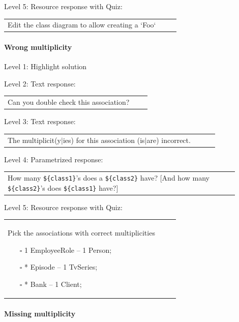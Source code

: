 \noindent Level 5: Resource response with Quiz: \medskip

\begin{tabular}{|p{0.9\linewidth}}
Edit the class diagram to allow creating a `Foo`
\end{tabular} \medskip


\paragraph{Wrong multiplicity}

\noindent Level 1: Highlight solution \medskip

\noindent Level 2: Text response: \medskip

\begin{tabular}{|p{0.9\linewidth}}
Can you double check this association?
\end{tabular} \medskip

\noindent Level 3: Text response: \medskip

\begin{tabular}{|p{0.9\linewidth}}
The multiplicit(y$|$ies) for this association (is$|$are) incorrect.
\end{tabular} \medskip

\noindent Level 4: Parametrized response: \medskip

\begin{tabular}{|p{0.9\linewidth}}
How many \verb|${class1}|'s does a \verb|${class2}| have? [And how many \verb|${class2}|'s does \verb|${class1}| have?]
\end{tabular} \medskip

\noindent Level 5: Resource response with Quiz: \medskip

\begin{tabular}{|p{0.9\linewidth}}
Pick the associations with correct multiplicities

\begin{itemize}
    \item[$\square$] 1 EmployeeRole -- 1 Person;
    \item[$\square$] * Episode -- 1 TvSeries;
    \item[$\square$] * Bank -- 1 Client;
\end{itemize}

\end{tabular} \medskip


\paragraph{Missing multiplicity}

